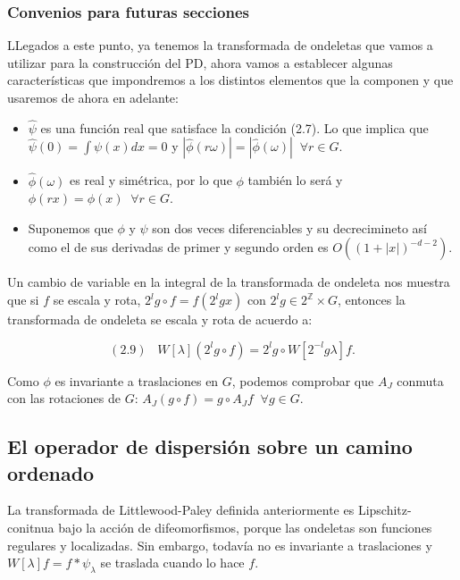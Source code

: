 \medskip


\subsubsection{Convenios para futuras secciones}

\noindent LLegados a este punto, ya tenemos la transformada de ondeletas que vamos a utilizar para la construcción del PD, ahora vamos a establecer algunas características que impondremos a los distintos elementos que la componen y que usaremos de ahora en adelante: 

\begin{itemize}
    \item $\widehat{\psi}$ es una función real que satisface la condición (2.7). Lo que implica que $\widehat{\psi}(0)=\int \psi(x)dx=0$ y $|\widehat{\phi}(r\omega)|=|\widehat{\phi}(\omega)| \;\; \forall r\in G$.
    \item $\widehat{\phi}(\omega)$ es real y simétrica, por lo que $\phi$ también lo será y $\phi(rx)=\phi(x) \;\; \forall r \in G$. 
    \item Suponemos que $\phi$ y $\psi$ son dos veces diferenciables y su decrecimineto así como el de sus derivadas de primer y segundo orden es $O((1+|x|)^{-d-2})$.
\end{itemize}

\medskip

\noindent Un cambio de variable en la integral de la transformada de ondeleta nos muestra que si $f$ se escala y rota, $2^lg \circ f=f(2^lgx)$ con $2^lg \in 2^{\mathbb{Z}} \times G$, entonces la transformada de ondeleta se escala y rota de acuerdo a: 

$$(2.9) \;\;\; W[\lambda](2^lg\circ f)=2^lg \circ W[2^{-l}g\lambda]f.$$

\medskip

\noindent Como $\phi$ es invariante a traslaciones en $G$, podemos comprobar que $A_J$ conmuta con las rotaciones de $G$: $A_J(g\circ f)=g\circ A_J f \;\; \forall g \in G$. 

\subsection{El operador de dispersión sobre un camino ordenado}

\noindent La transformada de Littlewood-Paley definida anteriormente es Lipschitz-conitnua bajo la acción de difeomorfismos, porque las ondeletas son funciones regulares y localizadas. Sin embargo, todavía no es invariante a traslaciones y $W[\lambda]f=f\ast\psi_\lambda$ se traslada cuando lo hace $f$.

